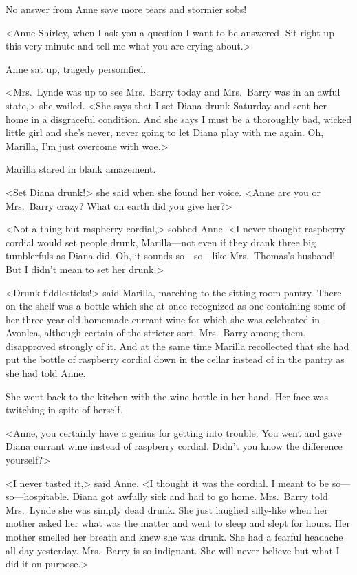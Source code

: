 No answer from Anne save more tears and stormier sobs!

<Anne Shirley, when I ask you a question I want to be answered. Sit right up this very minute and tell me what you are crying about.>

Anne sat up, tragedy personified.

<Mrs.~Lynde was up to see Mrs.~Barry today and Mrs.~Barry was in an awful state,> she wailed. <She says that I set Diana drunk Saturday and sent her home in a disgraceful condition. And she says I must be a thoroughly bad, wicked little girl and she's never, never going to let Diana play with me again. Oh, Marilla, I'm just overcome with woe.>

Marilla stared in blank amazement.

<Set Diana drunk!> she said when she found her voice. <Anne are you or Mrs.~Barry crazy? What on earth did you give her?>

<Not a thing but raspberry cordial,> sobbed Anne. <I never thought raspberry cordial would set people drunk, Marilla—not even if they drank three big tumblerfuls as Diana did. Oh, it sounds so—so—like Mrs.~Thomas's husband! But I didn't mean to set her drunk.>

<Drunk fiddlesticks!> said Marilla, marching to the sitting room pantry. There on the shelf was a bottle which she at once recognized as one containing some of her three-year-old homemade currant wine for which she was celebrated in Avonlea, although certain of the stricter sort, Mrs.~Barry among them, disapproved strongly of it. And at the same time Marilla recollected that she had put the bottle of raspberry cordial down in the cellar instead of in the pantry as she had told Anne.

She went back to the kitchen with the wine bottle in her hand. Her face was twitching in spite of herself.

<Anne, you certainly have a genius for getting into trouble. You went and gave Diana currant wine instead of raspberry cordial. Didn't you know the difference yourself?>

<I never tasted it,> said Anne. <I thought it was the cordial. I meant to be so—so—hospitable. Diana got awfully sick and had to go home. Mrs.~Barry told Mrs.~Lynde she was simply dead drunk. She just laughed silly-like when her mother asked her what was the matter and went to sleep and slept for hours. Her mother smelled her breath and knew she was drunk. She had a fearful headache all day yesterday. Mrs.~Barry is so indignant. She will never believe but what I did it on purpose.>

